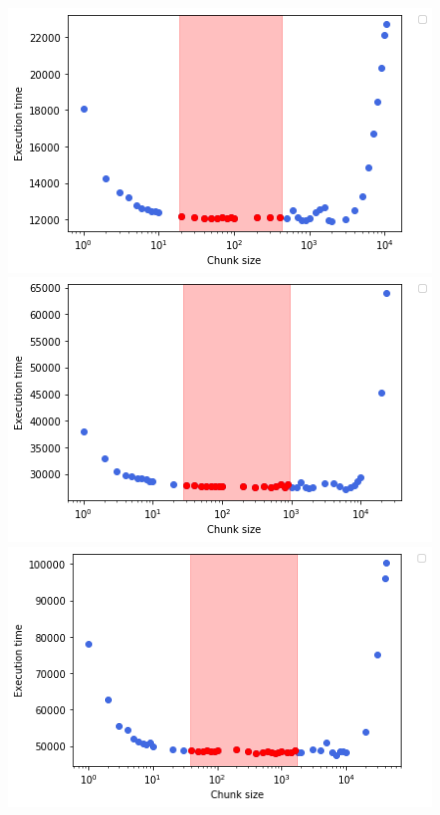 \begin{figure}[H]
	{\centering\includegraphics[scale=.4]{images/hpx_for_loop/blazemark/100000/chunk_sizes/marvin_pred_3193_8_10_500_19_432.png}	
		\label{fig57:d}}\hfill
	{\centering\includegraphics[scale=.4]{images/hpx_for_loop/blazemark/100000/chunk_sizes/marvin_pred_4855_8_10_500_28_960.png}	
		\label{fig57:f}}
	{\centering\includegraphics[scale=.4]{images/hpx_for_loop/blazemark/100000/chunk_sizes/marvin_pred_6420_8_10_500_38_1737.png}	
}
\end{figure}
